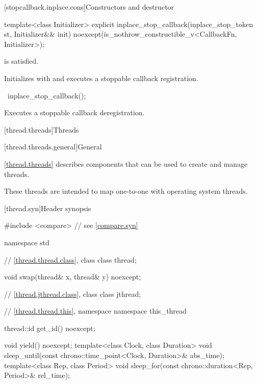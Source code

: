 [stopcallback.inplace.cons]{Constructors and destructor}

\begin{itemdecl}
template<class Initializer>
  explicit inplace_stop_callback(inplace_stop_token st, Initializer&& init)
    noexcept(is_nothrow_constructible_v<CallbackFn, Initializer>);
\end{itemdecl}

\begin{itemdescr}
\pnum
\constraints
{} is satisfied.

\pnum
\effects
Initializes  with 
and executes a stoppable callback registration.
\end{itemdescr}

\begin{itemdecl}
~inplace_stop_callback();
\end{itemdecl}

\begin{itemdescr}
\pnum
\effects
Executes a stoppable callback deregistration.
\end{itemdescr}

[thread.threads]{Threads}

[thread.threads.general]{General}

\pnum
\ref{thread.threads} describes components that can be used to create and manage threads.
\begin{note}
These threads are intended to map one-to-one with operating system threads.
\end{note}

[thread.syn]{Header  synopsis}

%
\begin{codeblock}
#include <compare>              // see \ref{compare.syn}

namespace std {
  // \ref{thread.thread.class}, class 
  class thread;

  void swap(thread& x, thread& y) noexcept;

  // \ref{thread.jthread.class}, class 
  class jthread;

  // \ref{thread.thread.this}, namespace 
  namespace this_thread {
    thread::id get_id() noexcept;

    void yield() noexcept;
    template<class Clock, class Duration>
      void sleep_until(const chrono::time_point<Clock, Duration>& abs_time);
    template<class Rep, class Period>
      void sleep_for(const chrono::duration<Rep, Period>& rel_time);
  }
}
\end{codeblock}

